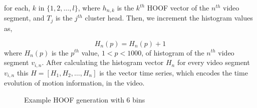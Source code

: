 for each, $k$ in $\{1,2,\dots, l\}$, where $h_{n,k}$ is the $k^{th}$ HOOF vector of the $n^{th}$ video segment, and $T_{j}$ is the $j^{th}$ cluster head. Then,
we increment the histogram values as,

\begin{equation}
H_{n}(p) = H_{n}(p)+1
\end{equation}
where $H_{n}(p)$ is the $p^{th}$ value, $1<p<1000$, of histogram of the $n^{th}$ video segment $v_{i,n}$. After calculating the histogram vector $H_{n}$ for every video segment $v_{i,n}$
this $H = [H_{1},H_{2}, \dots, H_{n}]$ is the vector time series, which encodes the time evolution of motion information, in the video.

\begin{figure}
  \centering
  
  \caption{Example HOOF generation with 6 bins}\label{fi:hoof}
\end{figure}
